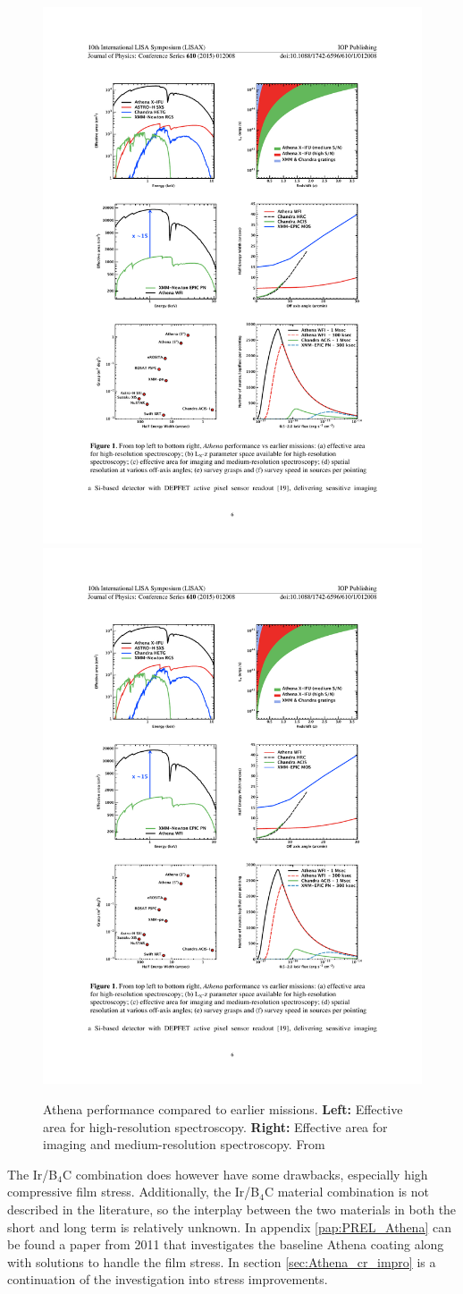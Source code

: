\begin{figure}[!h]
  \center
  \includegraphics[width=0.47\linewidth]{figures/athena/athena_eff_area_ifu.pdf}
  \includegraphics[width=0.47\linewidth]{figures/athena/athena_eff_area_wfi.pdf}
\caption{\footnotesize Athena performance compared to earlier missions. \textbf{Left:} Effective area for high-resolution spectroscopy. \textbf{Right:} Effective area for imaging and medium-resolution spectroscopy. From \cite{Barcons:2015dd}}\label{fig:ath_eff_area}
\end{figure}

The Ir/B$_4$C combination does however have some drawbacks, especially high compressive film stress. Additionally, the Ir/B$_4$C material combination is not described in the literature, so the interplay between the two materials in both the short and long term is relatively unknown. In appendix \ref{pap:PREL_Athena} can be found a paper from 2011 that investigates the baseline Athena coating along with solutions to handle the film stress. In section \ref{sec:Athena_cr_impro} is a continuation of the investigation into stress improvements.


